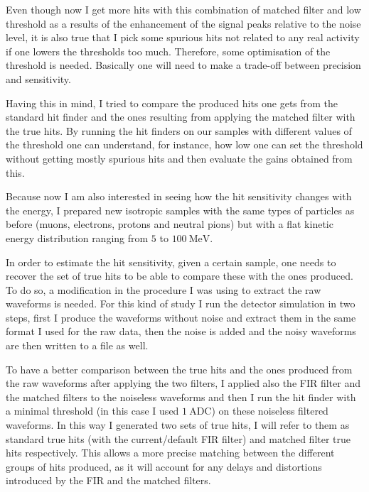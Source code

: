 Even though now I get more hits with this combination of matched filter and low threshold as a results of the enhancement of the signal peaks relative to the noise level, it is also true that I pick some spurious hits not related to any real activity if one lowers the thresholds too much. Therefore, some optimisation of the threshold is needed. Basically one will need to make a trade-off between precision and sensitivity.

Having this in mind, I tried to compare the produced hits one gets from the standard hit finder and the ones resulting from applying the matched filter with the true hits. By running the hit finders on our samples with different values of the threshold one can understand, for instance, how low one can set the threshold without getting mostly spurious hits and then evaluate the gains obtained from this.

Because now I am also interested in seeing how the hit sensitivity changes with the energy, I prepared new isotropic samples with the same types of particles as before (muons, electrons, protons and neutral pions) but with a flat kinetic energy distribution ranging from $5$ to $100 \ \mathrm{MeV}$.

In order to estimate the hit sensitivity, given a certain sample, one needs to recover the set of true hits to be able to compare these with the ones produced. To do so, a modification in the procedure I was using to extract the raw waveforms is needed. For this kind of study I run the detector simulation in two steps, first I produce the waveforms without noise and extract them in the same format I used for the raw data, then the noise is added and the noisy waveforms are then written to a file as well.

To have a better comparison between the true hits and the ones produced from the raw waveforms after applying the two filters, I applied also the FIR filter and the matched filters to the noiseless waveforms and then I run the hit finder with a minimal threshold (in this case I used $1 \ \mathrm{ADC}$) on these noiseless filtered waveforms. In this way I generated two sets of true hits, I will refer to them as standard true hits (with the current/default FIR filter) and matched filter true hits respectively. This allows a more precise matching between the different groups of hits produced, as it will account for any delays and distortions introduced by the FIR and the matched filters.

